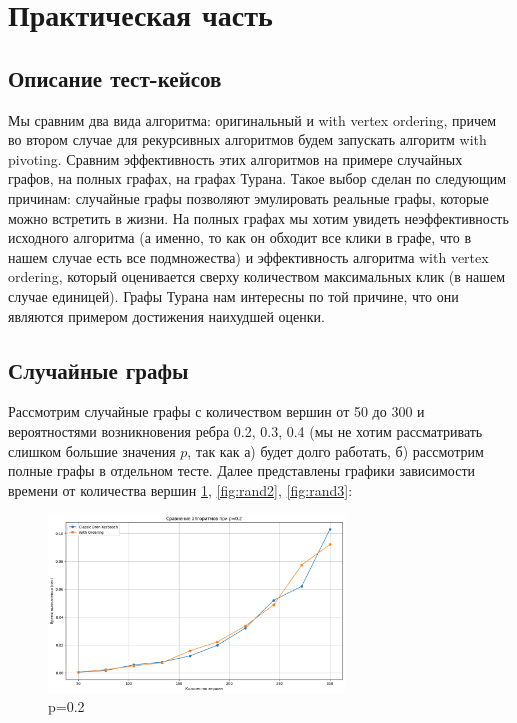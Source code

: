 \documentclass{article}
\begin{document}
\newpage
\section{Практическая часть}
\subsection{Описание тест-кейсов}
Мы сравним два вида алгоритма: оригинальный и with vertex ordering, причем во втором случае для рекурсивных алгоритмов будем запускать алгоритм with pivoting. Сравним эффективность этих алгоритмов на примере случайных графов, на полных графах, на графах Турана. Такое выбор сделан по следующим причинам: случайные графы позволяют эмулировать реальные графы, которые можно встретить в жизни. На полных графах мы хотим увидеть неэффективность исходного алгоритма (а именно, то как он обходит все клики в графе, что в нашем случае есть все подмножества) и эффективность алгоритма with vertex ordering, который оценивается сверху количеством максимальных клик (в нашем случае единицей). Графы Турана нам интересны по той причине, что они являются примером достижения наихудшей оценки.

\subsection{Случайные графы}
Рассмотрим случайные графы с количеством вершин от 50 до 300 и вероятностями возникновения ребра 0.2, 0.3, 0.4 (мы не хотим рассматривать слишком большие значения $p$, так как а) будет долго работать, б) рассмотрим полные графы в отдельном тесте.
Далее представлены графики зависимости времени от количества вершин \ref{fig:rand1}, \ref{fig:rand2}, \ref{fig:rand3}:

\begin{figure}[htbp] %
  \centering %
  \includegraphics[width=0.7\textwidth]{image/rand1.png}
  \caption{p=0.2} %
  \label{fig:rand1} %
\end{figure}
\end{document}
